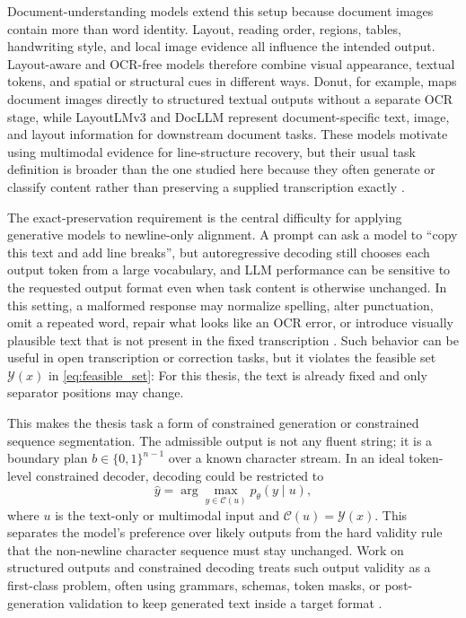 Document-understanding models extend this setup because document images contain more than word identity. Layout, reading order, regions, tables, handwriting style, and local image evidence all influence the intended output. Layout-aware and OCR-free models therefore combine visual appearance, textual tokens, and spatial or structural cues in different ways. Donut, for example, maps document images directly to structured textual outputs without a separate OCR stage, while LayoutLMv3 and DocLLM represent document-specific text, image, and layout information for downstream document tasks. These models motivate using multimodal evidence for line-structure recovery, but their usual task definition is broader than the one studied here because they often generate or classify content rather than preserving a supplied transcription exactly .

The exact-preservation requirement is the central difficulty for applying generative models to newline-only alignment. A prompt can ask a model to ``copy this text and add line breaks'', but autoregressive decoding still chooses each output token from a large vocabulary, and LLM performance can be sensitive to the requested output format even when task content is otherwise unchanged. In this setting, a malformed response may normalize spelling, alter punctuation, omit a repeated word, repair what looks like an OCR error, or introduce visually plausible text that is not present in the fixed transcription . Such behavior can be useful in open transcription or correction tasks, but it violates the feasible set \(\mathcal{Y}(x)\) in \autoref{eq:feasible_set}: For this thesis, the text is already fixed and only separator positions may change.

This makes the thesis task a form of constrained generation or constrained sequence segmentation. The admissible output is not any fluent string; it is a boundary plan \(b\in\{0,1\}^{n-1}\) over a known character stream. In an ideal token-level constrained decoder, decoding could be restricted to
\begin{equation}
\hat{y}=\arg\max_{y\in\mathcal{C}(u)} p_\theta(y\mid u),
\label{eq:generic_constrained_decoding}
\end{equation}
where \(u\) is the text-only or multimodal input and \(\mathcal{C}(u)=\mathcal{Y}(x)\). This separates the model's preference over likely outputs from the hard validity rule that the non-newline character sequence must stay unchanged. Work on structured outputs and constrained decoding treats such output validity as a first-class problem, often using grammars, schemas, token masks, or post-generation validation to keep generated text inside a target format .

